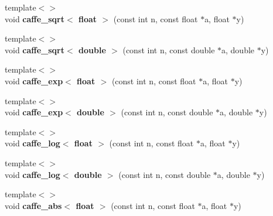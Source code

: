 \begin{DoxyCompactItemize}
\item 
{\footnotesize template$<$$>$ }\\void {\bfseries caffe\+\_\+sqrt$<$ float $>$} (const int n, const float $\ast$a, float $\ast$y)\hypertarget{namespacecaffe_a972c4f9b0e5adbde79244f7d233b7416}{}\label{namespacecaffe_a972c4f9b0e5adbde79244f7d233b7416}

\item 
{\footnotesize template$<$$>$ }\\void {\bfseries caffe\+\_\+sqrt$<$ double $>$} (const int n, const double $\ast$a, double $\ast$y)\hypertarget{namespacecaffe_a83d092226d5f4af982a5ee4670a8f81d}{}\label{namespacecaffe_a83d092226d5f4af982a5ee4670a8f81d}

\item 
{\footnotesize template$<$$>$ }\\void {\bfseries caffe\+\_\+exp$<$ float $>$} (const int n, const float $\ast$a, float $\ast$y)\hypertarget{namespacecaffe_a0553e22b5a2615ce54bb22bab6a4df15}{}\label{namespacecaffe_a0553e22b5a2615ce54bb22bab6a4df15}

\item 
{\footnotesize template$<$$>$ }\\void {\bfseries caffe\+\_\+exp$<$ double $>$} (const int n, const double $\ast$a, double $\ast$y)\hypertarget{namespacecaffe_ab934b2004cda176643660f2029ff9fa2}{}\label{namespacecaffe_ab934b2004cda176643660f2029ff9fa2}

\item 
{\footnotesize template$<$$>$ }\\void {\bfseries caffe\+\_\+log$<$ float $>$} (const int n, const float $\ast$a, float $\ast$y)\hypertarget{namespacecaffe_acb0328e4604ee2bb2829c1ab069a047b}{}\label{namespacecaffe_acb0328e4604ee2bb2829c1ab069a047b}

\item 
{\footnotesize template$<$$>$ }\\void {\bfseries caffe\+\_\+log$<$ double $>$} (const int n, const double $\ast$a, double $\ast$y)\hypertarget{namespacecaffe_a21f7168d644e539376f94aabd9fea305}{}\label{namespacecaffe_a21f7168d644e539376f94aabd9fea305}

\item 
{\footnotesize template$<$$>$ }\\void {\bfseries caffe\+\_\+abs$<$ float $>$} (const int n, const float $\ast$a, float $\ast$y)\hypertarget{namespacecaffe_ae723398dd9f752078438ba1e9e07f084}{}\label{namespacecaffe_ae723398dd9f752078438ba1e9e07f084}


\end{DoxyCompactItemize}
